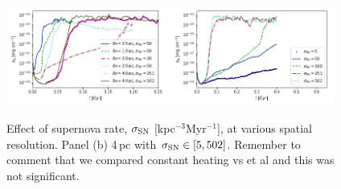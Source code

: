 \documentclass[iop,apj,numberedappendix,twocolappendix]{emulateapj}
\newcommand{\fg}[1]{\textcolor{midblue}{#1}}
\begin{document}
\begin{figure}
\centering
\includegraphics[trim=0.0cm 0.0cm 0.0cm 0.0cm,clip=true,width=0.47\textwidth]{csc_figs/sn_dx.png}
\includegraphics[trim=0.0cm 0.0cm 0.0cm 0.0cm,clip=true,width=0.47\textwidth]{csc_figs/sn4pc.png}
\caption{
Effect of supernova rate, $\sigma_{\rm SN}$ [kpc$^{-3}$Myr$^{-1}$], at various
spatial resolution. Panel (b) 4\,pc with $\sigma_{\rm SN} \in[5,502]$.
\fg{Remember to comment that we compared constant heating vs \citet{Wolfire:1995} et al and this was not significant.}
\label{fig:brms_SNrate}
}
\end{figure}
\end{document}

